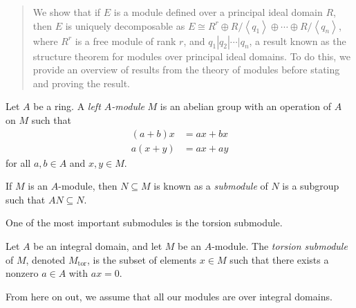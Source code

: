 \documentclass[10pt]{mypackage}
\DeclareMathOperator{\tor}{tor}
\begin{document}
\RaggedRight
\begin{abstract}
  \noindent We show that if $E$ is a module defined over a principal ideal domain $R$, then $E$ is uniquely decomposable as $E \cong R^{r}\oplus R/\left\langle q_1 \right\rangle\oplus \cdots \oplus R/\left\langle q_n \right\rangle$, where $R^{r}$ is a free module of rank $r$, and $q_1 | q_2 | \cdots | q_n$, a result known as the structure theorem for modules over principal ideal domains. To do this, we provide an overview of results from the theory of modules before stating and proving the result.
\end{abstract}
\begin{definition}
  Let $A$ be a ring. A \textit{left $A$-module} $M$ is an abelian group with an operation of $A$ on $M$ such that
  \begin{align*}
    \left( a + b \right)x &= ax + bx\\
    a\left( x + y \right) &= ax + ay
  \end{align*}
  for all $a,b\in A$ and $x,y\in M$.\newline

  If $M$ is an $A$-module, then $N\subseteq M$ is known as a \textit{submodule} of $N$ is a subgroup such that $AN \subseteq N$.
\end{definition}
One of the most important submodules is the torsion submodule.
\begin{definition}
  Let $A$ be an integral domain, and let $M$ be an $A$-module. The \textit{torsion submodule} of $M$, denoted $M_{\tor}$, is the subset of elements $x\in M$ such that there exists a nonzero $a\in A$ with $ax = 0$.
\end{definition}
From here on out, we assume that all our modules are over integral domains.\newline
\end{document}
